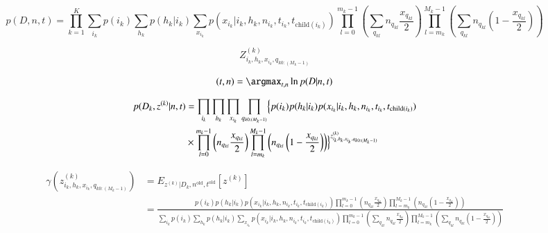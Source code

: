 \documentclass[10pt]{jsarticle}
\begin{document}

{}

\begin{equation}
 p(D , n, t) = \prod_{k=1}^{K} \sum_{i_k} p(i_k) \sum_{h_k} p(h_k | i_k) \sum_{x_{i_k}} p(x_{i_k} | i_k, h_k, n_{i_k}, t_{i_k}, t_{\mathrm{child}(i_k)})
  \prod_{l=0}^{m_k - 1} \left( \sum_{q_{kl}} n_{q_{kl}} \frac{x_{q_{kl}}}{2} \right) \prod_{l=m_k}^{M_k - 1} \left( \sum_{q_{kl}} n_{q_{kl}} \left(1-\frac{x_{q_{kl}}}{2} \right) \right)
\end{equation}

\begin{equation}
 Z^{(k)}_{i_k, h_k, x_{i_k}, q_{k 0:(M_k - 1)}}
\end{equation}

\begin{equation}
 (t, n) = \argmax_{t, n} \ln p(D | n, t)
\end{equation}

\begin{align}
 p(D_k, z^{(k)} | n, t) &= \prod_{i_k} \prod_{h_k} \prod_{x_{i_k}} \prod_{q_{k 0:(M_k - 1)}} \Bigl\{p(i_k) p(h_k | i_k) p(x_{i_k} | i_k, h_k, n_{i_k}, t_{i_k}, t_{\mathrm{child}(i_k)})\\
&\times \prod_{l=0}^{m_k - 1} \left( n_{q_{kl}} \frac{x_{q_{kl}}}{2} \right) \prod_{l=m_k}^{M_k - 1} \left( n_{q_{kl}} \left(1-\frac{x_{q_{kl}}}{2} \right) \right) \Bigr\}^{z^{(k)}_{i_k, h_k, x_{i_k}, q_{k 0:(M_k - 1)}}}
\end{align}

\begin{align}
 \gamma(z^{(k)}_{i_k, h_k, x_{i_k}, q_{k 0:(M_k - 1)}}) &= E_{z^{(k)} | D_k, n^{\mathrm{old}}, t^{\mathrm{old}}} \left[z^{(k)}\right]\\
 &= \frac{p(i_k) p(h_k | i_k) p(x_{i_k} | i_k, h_k, n_{i_k}, t_{i_k}, t_{\mathrm{child}(i_k)}) \prod_{l=0}^{m_k - 1} \left( n_{q_{kl}} \frac{x_{q_{kl}}}{2} \right) \prod_{l=m_k}^{M_k - 1} \left( n_{q_{kl}} \left(1-\frac{x_{q_{kl}}}{2} \right) \right)}{\sum_{i_k} p(i_k) \sum_{h_k} p(h_k | i_k) \sum_{x_{i_k}} p(x_{i_k} | i_k, h_k, n_{i_k}, t_{i_k}, t_{\mathrm{child}(i_k)})
  \prod_{l=0}^{m_k - 1} \left( \sum_{q_{kl}} n_{q_{kl}} \frac{x_{q_{kl}}}{2} \right) \prod_{l=m_k}^{M_k - 1} \left( \sum_{q_{kl}} n_{q_{kl}} \left(1-\frac{x_{q_{kl}}}{2} \right) \right)}
\end{align}
\end{document}
